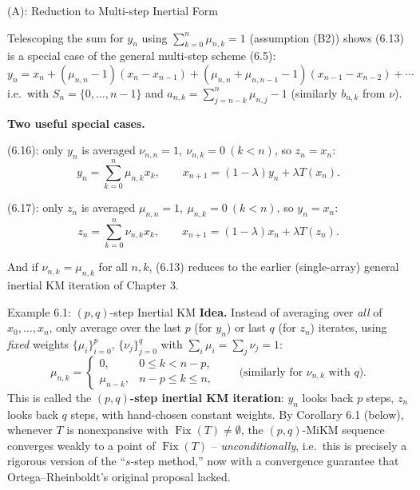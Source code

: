 \documentclass[aspectratio=169,10pt]{beamer}
\newcommand{\Fix}{\operatorname{Fix}}
\begin{document}
\begin{frame}[allowframebreaks]{(A): Reduction to Multi-step Inertial Form}

Telescoping the sum for $y_n$ using $\sum_{k=0}^n\mu_{n,k}=1$ (assumption
(B2)) shows (6.13) is a special case of the general multi-step scheme
(6.5):
\[
y_n = x_n + (\mu_{n,n}-1)(x_n-x_{n-1}) + (\mu_{n,n}+\mu_{n,n-1}-1)(x_{n-1}-x_{n-2})
+\cdots
\]
i.e.\ with $S_n=\{0,\dots,n-1\}$ and
$a_{n,k}=\sum_{j=n-k}^n\mu_{n,j}-1$ (similarly $b_{n,k}$ from $\nu$).

\textbf{Two useful special cases.}
\begin{block}{(6.16): only $y_n$ is averaged}
$\nu_{n,n}=1,\ \nu_{n,k}=0\ (k<n)$, so $z_n=x_n$:
\[
y_n=\sum_{k=0}^n\mu_{n,k}x_k, \qquad x_{n+1}=(1-\lambda)y_n+\lambda T(x_n).
\]
\end{block}
\begin{block}{(6.17): only $z_n$ is averaged}
$\mu_{n,n}=1,\ \mu_{n,k}=0\ (k<n)$, so $y_n=x_n$:
\[
z_n=\sum_{k=0}^n\nu_{n,k}x_k, \qquad x_{n+1}=(1-\lambda)x_n+\lambda T(z_n).
\]
\end{block}
And if $\nu_{n,k}=\mu_{n,k}$ for all $n,k$, (6.13) reduces to the earlier
(single-array) general inertial KM iteration of Chapter 3.

\end{frame}

\begin{frame}{Example 6.1: $(p,q)$-step Inertial KM}
\textbf{Idea.} Instead of averaging over \emph{all} of $x_0,\dots,x_n$,
only average over the last $p$ (for $y_n$) or last $q$ (for $z_n$)
iterates, using \emph{fixed} weights $\{\mu_i\}_{i=0}^p$, $\{\nu_j\}_{j=0}^q$
with $\sum_i\mu_i=\sum_j\nu_j=1$:
\[
\mu_{n,k}=
\begin{cases}
0, & 0\le k< n-p,\\
\mu_{n-k}, & n-p\le k\le n,
\end{cases}
\qquad\text{(similarly for $\nu_{n,k}$ with $q$).}
\]
This is called the \textbf{$(p,q)$-step inertial KM iteration}: $y_n$
looks back $p$ steps, $z_n$ looks back $q$ steps, with hand-chosen
constant weights. By Corollary 6.1 (below), whenever $T$ is nonexpansive
with $\Fix(T)\ne\emptyset$, the $(p,q)$-MiKM sequence converges weakly to a
point of $\Fix(T)$ -- \emph{unconditionally}, i.e.\ this is precisely a
rigorous version of the ``$s$-step method,'' now with a convergence
guarantee that Ortega--Rheinboldt's original proposal lacked.
\end{frame}
\end{document}
